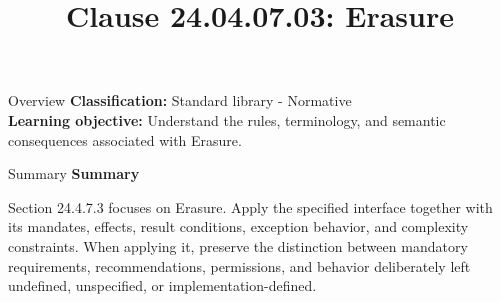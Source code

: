 \documentclass[10pt,letterpaper]{article}
\title{Clause 24.04.07.03: Erasure}
\author{}
\date{}
\begin{document}
\maketitle
\begin{CornellOverviewBox}{Overview}
\textbf{Classification:} Standard library - Normative\\[2pt]
\textbf{Learning objective:} Understand the rules, terminology, and semantic consequences associated with Erasure.
\end{CornellOverviewBox}\begin{CornellSummaryBox}{Summary}
{\sffamily\bfseries\color{Accent} Summary}\par\vspace{3pt}Section 24.4.7.3 focuses on Erasure. Apply the specified interface together with its mandates, effects, result conditions, exception behavior, and complexity constraints. When applying it, preserve the distinction between mandatory requirements, recommendations, permissions, and behavior deliberately left undefined, unspecified, or implementation-defined.
\end{CornellSummaryBox}
\end{document}
